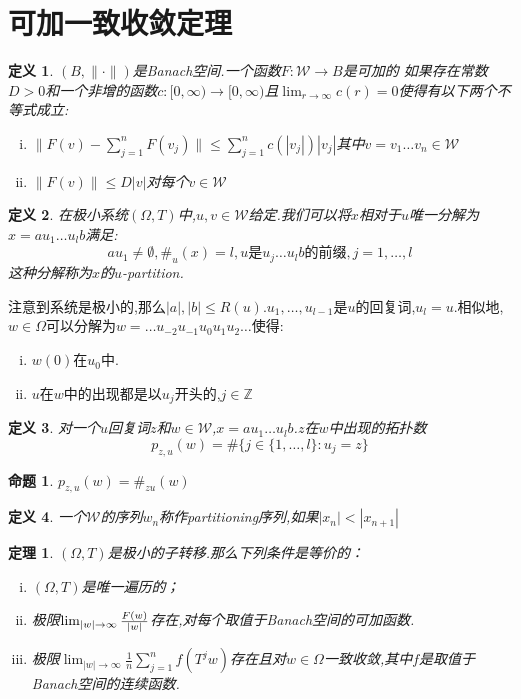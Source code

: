 \documentclass[a4paper,11pt,oneside]{book}
\newtheorem{theorem}{\textbf{\hspace{0.7cm}定理}}[section]
\newtheorem{definition}{\textbf{\hspace{0.7cm}定义}}[section]
\newtheorem{proposition}{\textbf{\hspace{0.7cm}命题}}[section]
\begin{document}
\section{可加一致收敛定理}
\begin{definition}
$(B,\|\cdot\|)$是Banach空间.一个函数$F:\mathcal{W}\rightarrow B$是可加的
如果存在常数$D>0$和一个非增的函数$c:[0,\infty)\rightarrow [0,\infty)$且$\lim_{r\to\infty}c(r)=0$使得有以下两个不等式成立:
\begin{enumerate}[(i)]
\item $\|F(v)-\sum_{j=1}^nF(v_j)\|\leq\sum_{j=1}^n c(|v_j|)|v_j|$其中$v=v_1\ldots v_n\in\mathcal{W}$
\item $\|F(v)\|\leq D|v|$对每个$v\in\mathcal{W}$
\end{enumerate}
\end{definition}

\begin{definition}
在极小系统$(\Omega,T)$中,$u,v\in\mathcal{W}$给定.我们可以将$x$相对于$u$唯一分解为$x=au_1\ldots u_lb$满足:
$$au_1\ne\emptyset,\#_u(x)=l,u\text{是}u_j\ldots u_lb\text{的前缀},j=1,\ldots,l$$
这种分解称为$x$的$u$-partition.
\end{definition}

注意到系统是极小的,那么$|a|,|b|\leq R(u)$.$u_1,\ldots,u_{l-1}$是$u$的回复词,$u_l=u$.相似地,$w\in\Omega$可以分解为$w=\ldots u_{-2}u_{-1}u_0u_1u_2\ldots$使得:
\begin{enumerate}[(i)]
\item $w(0)$在$u_0$中.
\item $u$在$w$中的出现都是以$u_j$开头的,$j\in \mathbb{Z}$
\end{enumerate}

\begin{definition}
对一个$u$回复词$z$和$w\in\mathcal{W}$,$x=au_1\ldots u_lb$.$z$在$w$中出现的拓扑数
$$p_{z,u}(w)=\#\{j\in\{1,\ldots,l\}:u_j=z\}$$
\end{definition}

\begin{proposition}
$p_{z,u}(w)=\#_{zu}(w)$
\end{proposition}

\begin{definition}
一个$\mathcal{W}$的序列${w_n}$称作partitioning序列,如果$|x_n|<|x_{n+1}|$
\end{definition}
\begin{theorem}
$(\Omega,T)$是极小的子转移.那么下列条件是等价的：
\begin{enumerate}[(i)]
\item $(\Omega,T)$是唯一遍历的；
\item 极限$\lim_{|w|\to \infty}{F(w)\over |w|}$存在,对每个取值于Banach空间的可加函数.
\item 极限$\lim_{|w|\to \infty}\frac{1}{n}\sum_{j=1}^n{f(T^jw)}$存在且对$w\in \Omega$一致收敛,其中$f$是取值于Banach空间的连续函数.
\end{enumerate}
\end{theorem}
\end{document}
